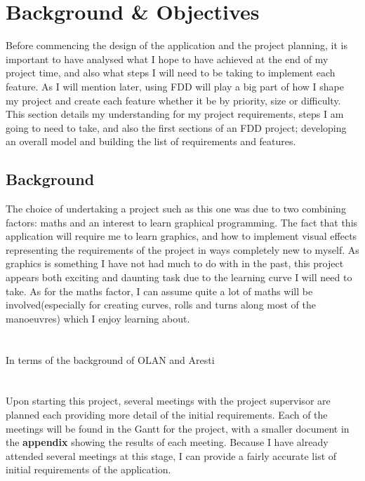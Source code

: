 \chapter{Background \& Objectives}
Before commencing the design of the application and the project planning, it is important to have analysed what I hope to have achieved at the end of my project time, and also what steps I will need to be taking to implement each feature. As I will mention later, using FDD will play a big part of how I shape my project and create each feature whether it be by priority, size or difficulty. This section details my understanding for my project requirements, steps I am going to need to take, and also the first sections of an FDD project; developing an overall model and building the list of requirements and features.

\section{Background}
The choice of undertaking a project such as this one was due to two combining factors: maths and an interest to learn graphical programming. The fact that this application will require me to learn graphics, and how to implement visual effects representing the requirements of the project in ways completely new to myself. As graphics is something I have not had much to do with in the past, this project appears both exciting and daunting task due to the learning curve I will need to take. As for the maths factor, I can assume quite a lot of maths will be involved(especially for creating curves, rolls and turns along most of the manoeuvres) which I enjoy learning about.\\   \\ \\
In terms of the background of OLAN and Aresti\\ \\ \\
Upon starting this project, several meetings with the project supervisor are planned each providing more detail of the initial requirements. Each of the meetings will be found in the Gantt for the project, with a smaller document in the\textbf{ appendix} showing the results of each meeting. Because I have already attended several meetings at this stage, I can provide a fairly accurate list of initial requirements of the application.\\

